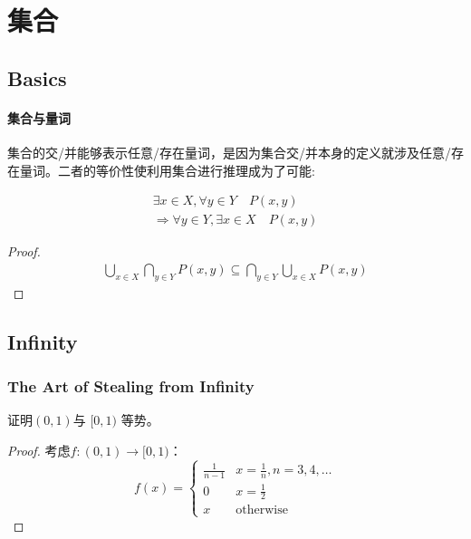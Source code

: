 \chapter{集合}
\section{Basics}

\subsubsection{集合与量词}

集合的交/并能够表示任意/存在量词，是因为集合交/并本身的定义就涉及任意/存在量词。二者的等价性使利用集合进行推理成为了可能:

\begin{theorem}
    \begin{align*}
        \exists x \in X, \forall y \in Y \quad P(x,y) \\
        \Rightarrow \forall y \in Y, \exists x \in X \quad P(x,y)
    \end{align*}
\end{theorem}

\begin{proof}
    \begin{align*}
        \bigcup_{x \in X} \bigcap_{y \in Y} P(x,y) \subseteq
        \bigcap_{y \in Y} \bigcup_{x \in X} P(x,y)
    \end{align*}
\end{proof}

\section{Infinity}
\subsection{The Art of Stealing from Infinity}

\begin{problem}
    证明\((0,1)\)与 \([0,1)\) 等势。
\end{problem}

\begin{proof}
    考虑\(f:(0,1) \to [0,1)\)：\[
        f(x) =
        \begin{cases}
            \frac{1}{n-1} & x =\frac{1}{n}, n=3,4,\dots  \\
            0 & x=\frac{1}{2} \\
            x & \text{otherwise}
        \end{cases}
    \]
\end{proof}

